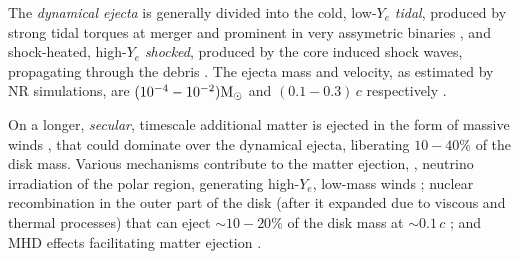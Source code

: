 





The \textit{dynamical ejecta} is generally divided into 
the cold, low-$Y_e$ \textit{tidal}, produced by strong tidal torques at merger 
and prominent in very assymetric binaries
\citep{Rosswog:1998hy,Radice:2016dwd,Dietrich:2016hky},
and shock-heated, high-$Y_e$ \textit{shocked}, produced 
by the core \bnc{} induced shock waves, propagating through the \pmerg{} debris 
\citep{Hotokezaka:2013b, Bauswein:2013yna, Sekiguchi:2016bjd, Dietrich:2016hky, Radice:2018pdn}. 
%
The ejecta mass and velocity, as estimated by \ac{NR} simulations, are 
$(10^{-4}-10^{-2}){\text{M}_{\odot}}$ and $(0.1-0.3)\,c$ respectively 
\citep{Hotokezaka:2013b,Bauswein:2013yna,Sekiguchi:2016bjd,Radice:2018pdn}.

On a longer, \textit{secular}, timescale additional matter is ejected in the form of 
massive winds \citep{Lee:2009,Perego:2014fma,Fernandez:2015use,Siegel:2017nub,
    Fujibayashi:2017puw,Fernandez:2018kax,Miller:2019dpt}, %
that could dominate over the dynamical ejecta, liberating $10-40\%$ of the disk mass. 
Various mechanisms contribute to 
the matter ejection, \eg, neutrino irradiation of the polar region, generating high-$Y_e$, 
low-mass winds \citep{Perego:2014fma,Miller:2019dpt}; nuclear recombination in the outer 
part of the disk (after it expanded due to viscous and thermal processes) that can eject 
${\sim}10-20\%$ of the disk mass at ${\sim}0.1\,c$ \citep{Lee:2009,Fernandez:2015use,Fahlman:2018llv};
and \ac{MHD} effects facilitating matter ejection \citep{Fujibayashi:2017puw,Radice:2018xqa}.

